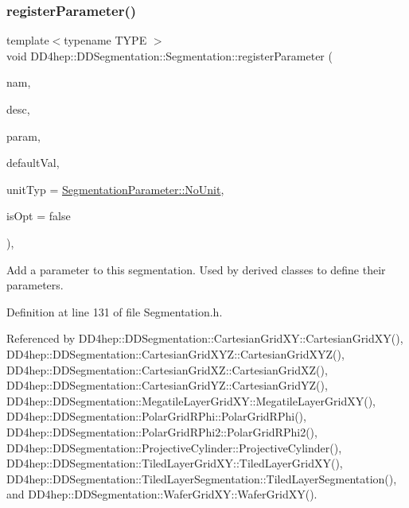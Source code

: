 \subsubsection{\texorpdfstring{register\+Parameter()}{registerParameter()}}
{\footnotesize\ttfamily template$<$typename T\+Y\+PE $>$ \\
void D\+D4hep\+::\+D\+D\+Segmentation\+::\+Segmentation\+::register\+Parameter (\begin{DoxyParamCaption}\item[{const std\+::string \&}]{nam,  }\item[{const std\+::string \&}]{desc,  }\item[{T\+Y\+PE \&}]{param,  }\item[{const T\+Y\+PE \&}]{default\+Val,  }\item[{\hyperlink{class_d_d4hep_1_1_d_d_segmentation_1_1_segmentation_parameter_a36f5f8b8d812b2a2b81363377565d8d4}{Unit\+Type}}]{unit\+Typ = {\ttfamily \hyperlink{class_d_d4hep_1_1_d_d_segmentation_1_1_segmentation_parameter_a36f5f8b8d812b2a2b81363377565d8d4ab217a538e0ac077135786260a2221c14}{Segmentation\+Parameter\+::\+No\+Unit}},  }\item[{bool}]{is\+Opt = {\ttfamily false} }\end{DoxyParamCaption})\hspace{0.3cm}{\ttfamily [inline]}, {\ttfamily [protected]}}



Add a parameter to this segmentation. Used by derived classes to define their parameters. 



Definition at line 131 of file Segmentation.\+h.



Referenced by D\+D4hep\+::\+D\+D\+Segmentation\+::\+Cartesian\+Grid\+X\+Y\+::\+Cartesian\+Grid\+X\+Y(), D\+D4hep\+::\+D\+D\+Segmentation\+::\+Cartesian\+Grid\+X\+Y\+Z\+::\+Cartesian\+Grid\+X\+Y\+Z(), D\+D4hep\+::\+D\+D\+Segmentation\+::\+Cartesian\+Grid\+X\+Z\+::\+Cartesian\+Grid\+X\+Z(), D\+D4hep\+::\+D\+D\+Segmentation\+::\+Cartesian\+Grid\+Y\+Z\+::\+Cartesian\+Grid\+Y\+Z(), D\+D4hep\+::\+D\+D\+Segmentation\+::\+Megatile\+Layer\+Grid\+X\+Y\+::\+Megatile\+Layer\+Grid\+X\+Y(), D\+D4hep\+::\+D\+D\+Segmentation\+::\+Polar\+Grid\+R\+Phi\+::\+Polar\+Grid\+R\+Phi(), D\+D4hep\+::\+D\+D\+Segmentation\+::\+Polar\+Grid\+R\+Phi2\+::\+Polar\+Grid\+R\+Phi2(), D\+D4hep\+::\+D\+D\+Segmentation\+::\+Projective\+Cylinder\+::\+Projective\+Cylinder(), D\+D4hep\+::\+D\+D\+Segmentation\+::\+Tiled\+Layer\+Grid\+X\+Y\+::\+Tiled\+Layer\+Grid\+X\+Y(), D\+D4hep\+::\+D\+D\+Segmentation\+::\+Tiled\+Layer\+Segmentation\+::\+Tiled\+Layer\+Segmentation(), and D\+D4hep\+::\+D\+D\+Segmentation\+::\+Wafer\+Grid\+X\+Y\+::\+Wafer\+Grid\+X\+Y().

